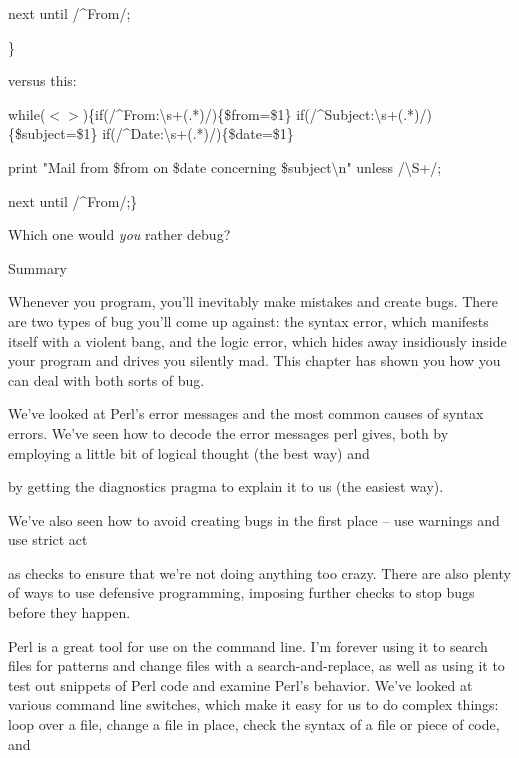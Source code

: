 \documentclass[a4paper,11pt]{book}
\begin{document}
\noindent 

\noindent next until /\^{}From/;

\noindent \}

\noindent 

\noindent versus this:

\noindent 

\noindent 

\noindent while($<$$>$)\{if(/\^{}From:\textbackslash s+(.*)/)\{\$from=\$1\} if(/\^{}Subject:\textbackslash s+(.*)/)\{\$subject=\$1\} if(/\^{}Date:\textbackslash s+(.*)/)\{\$date=\$1\}

\noindent print "Mail from \$from on \$date concerning \$subject\textbackslash n" unless /\textbackslash S+/;

\noindent next until /\^{}From/;\}

\noindent 

\noindent Which one would \textit{you }rather debug?

\noindent 

\noindent 

\noindent Summary

\noindent 

\noindent Whenever you program, you'll inevitably make mistakes and create bugs. There are two types of bug you'll come up against: the syntax error, which manifests itself with a violent bang, and the logic error, which hides away insidiously inside your program and drives you silently mad. This chapter has shown you how you can deal with both sorts of bug.

\noindent 

\noindent We've looked at Perl's error messages and the most common causes of syntax errors. We've seen how to decode the error messages perl gives, both by employing a little bit of logical thought (the best way) and

\noindent by getting the diagnostics pragma to explain it to us (the easiest way).

\noindent 

\noindent We've also seen how to avoid creating bugs in the first place -- use warnings and use strict act

\noindent as checks to ensure that we're not doing anything too crazy. There are also plenty of ways to use defensive programming, imposing further checks to stop bugs before they happen.

\noindent 

\noindent Perl is a great tool for use on the command line. I'm forever using it to search files for patterns and change files with a search-and-replace, as well as using it to test out snippets of Perl code and examine Perl's behavior. We've looked at various command line switches, which make it easy for us to do complex things: loop over a file, change a file in place, check the syntax of a file or piece of code, and
\end{document}
